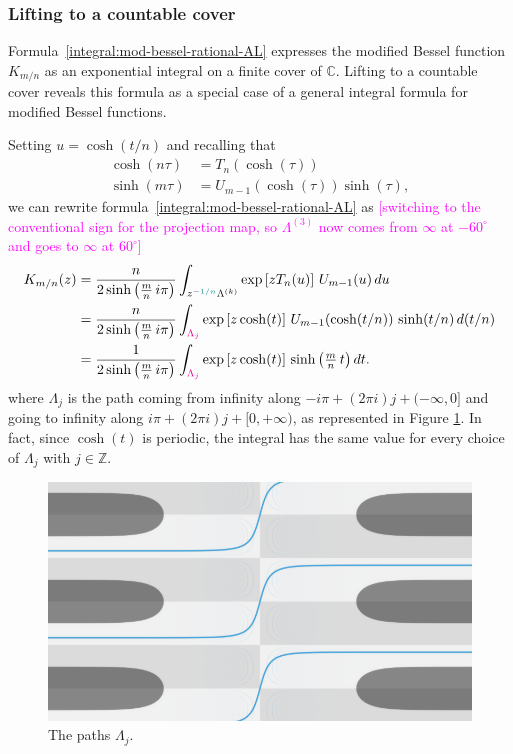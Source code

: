 \documentclass{article}
\newcommand{\Z}{\mathbb{Z}}
\newcommand{\C}{\mathbb{C}}
\theoremstyle{definition}
\theoremstyle{plain}
\begin{document}
\subsubsection{Lifting to a countable cover}\label{countable-cover}
Formula~\eqref{integral:mod-bessel-rational-AL} expresses the modified Bessel function $K_{m/n}$ as an exponential integral on a finite cover of $\C$. Lifting to a countable cover reveals this formula as a special case of a general integral formula for modified Bessel functions.

Setting $u = \cosh(t/n)$ and recalling that
\begin{align*}
\cosh(n\tau) & = T_n(\cosh(\tau)) \\
\sinh(m\tau) & = U_{m-1}(\cosh(\tau)) \sinh(\tau),
\end{align*}
we can rewrite formula~\eqref{integral:mod-bessel-rational-AL} as \textcolor{magenta}{[switching to the conventional sign for the projection map, so $\Lambda^{(3)}$ now comes from $\infty$ at $-60^\circ$ and goes to $\infty$ at $60^\circ$]}
\begin{align}
\notag K_{m/n}(z) & = \frac{n}{2 \sinh\big(\tfrac{m}{n}\,i\pi\big)} \int_{z^{-\textcolor{DarkCyan}{1/n}}\Lambda^{(k)}} \exp\left[z T_n(u)\right]\,U_{m-1}(u)\,du \\
\notag & = \frac{n}{2 \sinh\big(\tfrac{m}{n}\,i\pi\big)} \int_{\textcolor{magenta}{\Lambda_j}} \exp\left[z \cosh(t)\right]\,U_{m-1}(\cosh(t/n))\,\sinh(t/n)\,d(t/n) \\
\label{integral:mod-bessel-lifted} & = \frac{1}{2 \sinh\big(\tfrac{m}{n}\,i\pi\big)} \int_{\textcolor{magenta}{\Lambda_j}} \exp\left[z \cosh(t)\right]\,\sinh\big(\tfrac{m}{n}\,t\big)\,dt.
\end{align}
where $\Lambda_j$ is the path coming from infinity along $-i\pi+(2\pi i) j+(-\infty,0]$ and going to infinity along $i \pi+(2\pi i) j+[0,+\infty)$, as represented in Figure \ref{fig:bessel_unrolled}. In fact, since $\cosh(t)$ is periodic, the integral has the same value for every choice of $\Lambda_j$ with $j\in\Z$.  
\begin{figure}[ht]
    \centering
    \includegraphics[scale=0.3]{figures/Bessel0_unrolled_lightblue.png}
    \caption{The paths $\Lambda_j$.}
    \label{fig:bessel_unrolled}
\end{figure}
\end{document}
